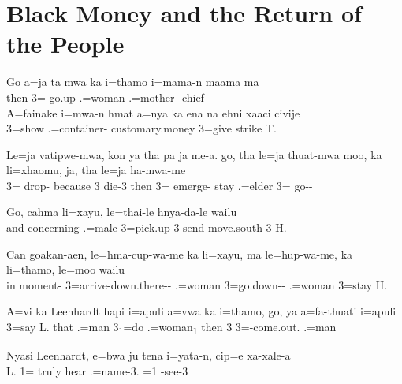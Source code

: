 \section{Black Money and the Return of the People}
 \ea
\gll Go a=ja ta mwa ka i=thamo i=mama-n maama ma\\ then 3= go.up   .=woman .=mother- chief\footnotemark {}\\ \glt {}
\z 
{}
\ea
\gll A=fainake i=mwa-n hmat a=nya ka ena na ehni xaaci civije\\ 3=show .=container- customary.money 3=give     strike T.\\ \glt {}
\z 

\ea
\gll Le=ja vatipwe-mwa, kon ya tha pa ja me-a. go, tha le=ja thuat-mwa moo, ka li=xhaomu, ja, tha le=ja ha-mwa-me\\ 3= drop- because 3    die-3 then  3= emerge- stay  .=elder   3= go--\\ 
\glt  {}
\z 

\ea
\gll Go, cahma li=xayu, le=thai-le hnya-da-le wailu\\ 
and concerning .=male 3=pick.up-3 send-move.south-3 H.\\ \glt {}
 \z 
 
 \ea
\gll Can goakan-aen, le=hma-cup-wa-me ka li=xayu, ma le=hup-wa-me, ka li=thamo, le=moo wailu \\ in moment- 3=arrive-down.there--  .=woman  3=go.down--  .=woman 3=stay H. \\ \glt {}
\z 

\ea
\gll A=vi ka Leenhardt hapi i=apuli a=vwa ka i=thamo, go, ya a=fa-thuati i=apuli\\ 3=say  L. that .=man 3\textsubscript{1}=do  .=woman\textsubscript{1} then 3 3=-come.out. .=man\\ 
\glt {}
\z 

\ea
\gll Nyasi Leenhardt, e=bwa ju tena i=yata-n, cip=e xa-xale-a \\  L. 1= truly hear .=name-3. =1 -see-3\\ 
\glt {}
\z
